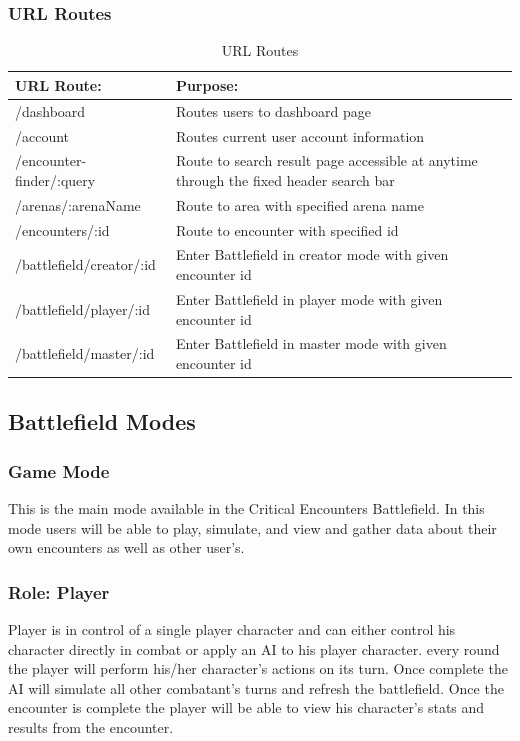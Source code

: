 \documentclass[12pt,a4paper]{report}
\begin{document}
	\subsubsection { URL Routes}
	
	\begin{table}[H]
		\begin{center}
			\begin{tabular}{ |p{5cm}|p{7cm}|| } 
				\hline
				URL Route: & Purpose: \\
				\hline
				/dashboard & Routes users to dashboard page \\
				/account & Routes current user account information\\
				/encounter-finder/:query & Route to search result page accessible at anytime through the fixed header search bar  \\
				/arenas/:arenaName & Route to area with specified arena name  \\
				/encounters/:id & Route to encounter with specified id \\
				/battlefield/creator/:id & Enter Battlefield in creator mode with given encounter id \\
				/battlefield/player/:id & Enter Battlefield in player mode with given encounter id \\
				/battlefield/master/:id & Enter Battlefield in master mode with given encounter id \\	
				\hline
			\end{tabular}
		\end{center}
		\caption{URL Routes} \label{table: URL Routes}
	\end{table}

	
	
	
	\subsection{Battlefield Modes}
	\subsubsection{Game Mode}
	This is the main mode available in the Critical Encounters Battlefield. In this mode users will be able to play, simulate, and view and gather data about their own encounters as well as other user's.
	\subsubsection{Role: Player}
	Player is in control of a single player character and can either control his character directly in combat or apply an AI to his player character. every round the player will perform his/her character's actions on its turn. Once complete the AI will simulate all other combatant's turns and refresh the battlefield. Once the encounter is complete the player will be able to view his character's stats and results from the encounter.
\end{document}
